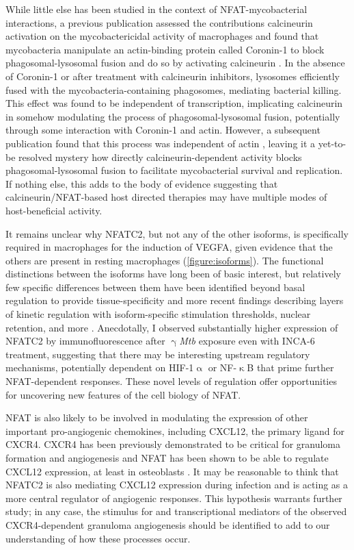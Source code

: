 While little else has been studied in the context of NFAT\hyp{}mycobacterial interactions, a previous publication assessed the contributions calcineurin activation on the mycobactericidal activity of macrophages and found that mycobacteria manipulate an actin\hyp{}binding protein called Coronin\hyp{}1 to block phagosomal\hyp{}lysosomal fusion and do so by activating calcineurin \citep{Jayachandran2007}. In the absence of Coronin\hyp{}1 or after treatment with calcineurin inhibitors, lysosomes efficiently fused with the mycobacteria\hyp{}containing phagosomes, mediating bacterial killing. This effect was found to be independent of transcription, implicating calcineurin in somehow modulating the process of phagosomal\hyp{}lysosomal fusion, potentially through some interaction with Coronin\hyp{}1 and actin. However, a subsequent publication found that this process was independent of actin \citep{Jayachandran2008}, leaving it a yet\hyp{}to\hyp{}be resolved mystery how directly calcineurin\hyp{}dependent activity blocks phagosomal\hyp{}lysosomal fusion to facilitate mycobacterial survival and replication. If nothing else, this adds to the body of evidence suggesting that calcineurin/NFAT\hyp{}based host directed therapies may have multiple modes of host\hyp{}beneficial activity.

It remains unclear why NFATC2, but not any of the other isoforms, is specifically required in macrophages for the induction of VEGFA, given evidence that the others are present in resting macrophages (\autoref{figure:isoforms}). The functional distinctions between the isoforms have long been of basic interest, but relatively few specific differences between them have been identified beyond basal regulation to provide tissue\hyp{}specificity and more recent findings describing layers of kinetic regulation with isoform\hyp{}specific stimulation thresholds, nuclear retention, and more \citep{Lyakh1997, Rao1997, Kar2014, Kar2015, Kar2016, Yissachar2013}. Anecdotally, I observed substantially higher expression of NFATC2 by immunofluorescence after $\upgamma$\textit{Mtb} exposure even with INCA\hyp{}6 treatment, suggesting that there may be interesting upstream regulatory mechanisms, potentially dependent on HIF\hyp{}1$\upalpha$ or NF\hyp{}$\upkappa$B that prime further NFAT-dependent responses. These novel levels of regulation offer opportunities for uncovering new features of the cell biology of NFAT.

NFAT is also likely to be involved in modulating the expression of other important pro\hyp{}angiogenic chemokines, including CXCL12, the primary ligand for CXCR4. CXCR4 has been previously demonstrated to be critical for granuloma formation and angiogenesis \citep{Torraca2017} and NFAT has been shown to be able to regulate CXCL12 expression, at least in osteoblasts \citep{Sesler2013}. It may be reasonable to think that NFATC2 is also mediating CXCL12 expression during infection and is acting as a more central regulator of angiogenic responses. This hypothesis warrants further study; in any case, the stimulus for and transcriptional mediators of the observed CXCR4\hyp{}dependent granuloma angiogenesis should be identified to add to our understanding of how these processes occur.

